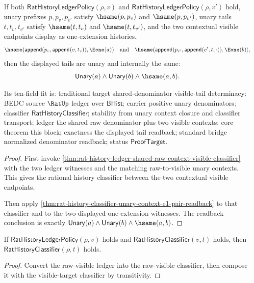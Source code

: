 \begin{theorem}
\label{thm:rat-history-ledger-shared-raw-context-e1-pair-readback}
If both $\mathsf{RatHistoryLedgerPolicy}(\rho,v)$ and
$\mathsf{RatHistoryLedgerPolicy}(\rho,v')$ hold, unary prefixes
$p,p_v,p_{v'}$ satisfy $\hsame(p,p_v)$ and $\hsame(p,p_{v'})$, unary tails
$t,t_v,t_{v'}$ satisfy $\hsame(t,t_v)$ and $\hsame(t,t_{v'})$, and the two
contextual visible endpoints display as one-extension histories,
$$
\hsame(\mathsf{append}(p_v,\mathsf{append}(v,t_v)),\Eone(a))
\quad\text{and}\quad
\hsame(\mathsf{append}(p_{v'},\mathsf{append}(v',t_{v'})),\Eone(b)),
$$
then the displayed tails are unary and internally the same:
$$
\mathsf{Unary}(a)\land \mathsf{Unary}(b)\land\hsame(a,b).
$$

Its ten-field fit is: traditional target shared-denominator visible-tail
determinacy; BEDC source $\RatUp$ ledger over $\mathsf{BHist}$; carrier positive
unary denominators; classifier $\mathsf{RatHistoryClassifier}$; stability from
unary context closure and classifier transport; ledger the shared raw
denominator plus two visible contexts; core theorem this block; exactness the
displayed tail readback; standard bridge normalized denominator readback; status
$\mathsf{ProofTarget}$.
\end{theorem}
\begin{proof}
First invoke
\autoref{thm:rat-history-ledger-shared-raw-context-visible-classifier} with the
two ledger witnesses and the matching raw-to-visible unary contexts. This gives
the rational history classifier between the two contextual visible endpoints.

Then apply
\autoref{thm:rat-history-classifier-unary-context-e1-pair-readback} to that
classifier and to the two displayed one-extension witnesses. The readback
conclusion is exactly $\mathsf{Unary}(a)\land \mathsf{Unary}(b)\land
\hsame(a,b)$.
\end{proof}

\begin{theorem}
\label{thm:rat-ledger-classifier-extension}
If $\mathsf{RatHistoryLedgerPolicy}(\rho,v)$ holds and
$\mathsf{RatHistoryClassifier}(v,t)$ holds, then
$\mathsf{RatHistoryClassifier}(\rho,t)$ holds.
\end{theorem}
\begin{proof}
Convert the raw-visible ledger into the raw-visible classifier, then compose it
with the visible-target classifier by transitivity.
\end{proof}

